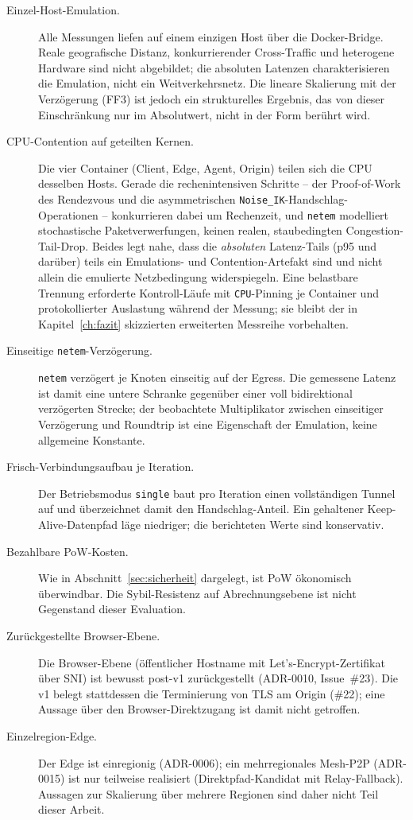 \begin{description}
  \item[Einzel-Host-Emulation.] Alle Messungen liefen auf einem einzigen Host
    über die Docker-Bridge. Reale geografische Distanz, konkurrierender
    Cross-Traffic und heterogene Hardware sind nicht abgebildet; die absoluten
    Latenzen charakterisieren die Emulation, nicht ein Weitverkehrsnetz. Die
    lineare Skalierung mit der Verzögerung (FF3) ist jedoch ein
    strukturelles Ergebnis, das von dieser Einschränkung nur im Absolutwert,
    nicht in der Form berührt wird.
  \item[CPU-Contention auf geteilten Kernen.] Die vier Container (Client, Edge,
    Agent, Origin) teilen sich die CPU desselben Hosts. Gerade die
    rechenintensiven Schritte -- der Proof-of-Work des Rendezvous und die
    asymmetrischen \texttt{Noise\_IK}-Handschlag-Operationen -- konkurrieren dabei
    um Rechenzeit, und \texttt{netem} modelliert stochastische Paketverwerfungen,
    keinen realen, staubedingten Congestion-Tail-Drop. Beides legt nahe, dass die
    \emph{absoluten} Latenz-Tails (p95 und darüber) teils ein Emulations- und
    Contention-Artefakt sind und nicht allein die emulierte Netzbedingung
    widerspiegeln. Eine belastbare Trennung erforderte Kontroll-Läufe mit
    \texttt{CPU}-Pinning je Container und protokollierter Auslastung während der
    Messung; sie bleibt der in Kapitel~\ref{ch:fazit} skizzierten erweiterten
    Messreihe vorbehalten.
  \item[Einseitige \texttt{netem}-Verzögerung.] \texttt{netem} verzögert je
    Knoten einseitig auf der Egress. Die gemessene Latenz ist damit eine untere
    Schranke gegenüber einer voll bidirektional verzögerten Strecke; der
    beobachtete Multiplikator zwischen einseitiger Verzögerung und Roundtrip ist
    eine Eigenschaft der Emulation, keine allgemeine Konstante.
  \item[Frisch-Verbindungsaufbau je Iteration.] Der Betriebsmodus
    \texttt{single} baut pro Iteration einen vollständigen Tunnel auf und
    überzeichnet damit den Handschlag-Anteil. Ein gehaltener Keep-Alive-Datenpfad
    läge niedriger; die berichteten Werte sind konservativ.
  \item[Bezahlbare PoW-Kosten.] Wie in Abschnitt~\ref{sec:sicherheit} dargelegt,
    ist PoW ökonomisch überwindbar. Die Sybil-Resistenz auf Abrechnungsebene ist
    nicht Gegenstand dieser Evaluation.
  \item[Zurückgestellte Browser-Ebene.] Die Browser-Ebene (öffentlicher
    Hostname mit Let's-Encrypt-Zertifikat über SNI) ist bewusst post-v1
    zurückgestellt (ADR-0010, Issue~\#23). Die v1 belegt stattdessen die
    Terminierung von TLS am Origin (\#22); eine Aussage über den
    Browser-Direktzugang ist damit nicht getroffen.
  \item[Einzelregion-Edge.] Der Edge ist einregionig (ADR-0006); ein
    mehrregionales Mesh-P2P (ADR-0015) ist nur teilweise realisiert
    (Direktpfad-Kandidat mit Relay-Fallback). Aussagen zur Skalierung über
    mehrere Regionen sind daher nicht Teil dieser Arbeit.
\end{description}

